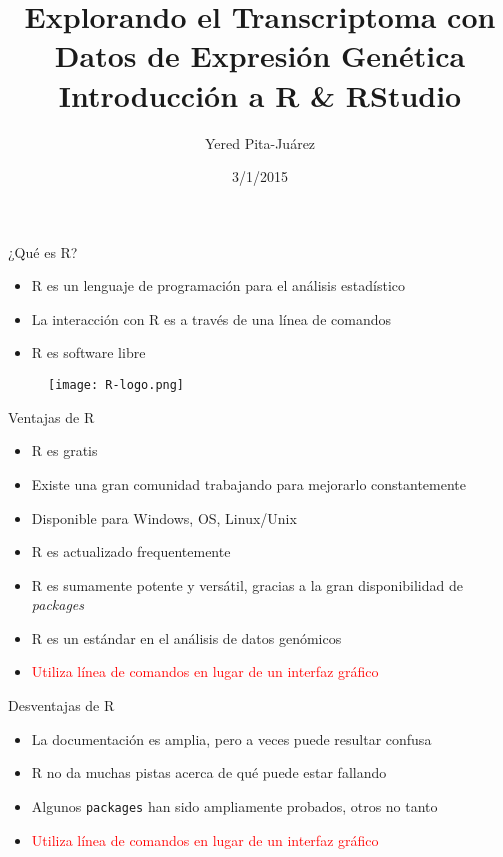 \documentclass{beamer}
\begin{document}
\title[Introducción a R \& RStudio]{Explorando el Transcriptoma con Datos de Expresi\'{o}n Gen\'{e}tica\\
\vspace{0.5cm}
Introducción a R \& RStudio}
\author{Yered Pita-Ju\'{a}rez}
\date{3/1/2015}

\begin{frame}
\titlepage
\end{frame}

\begin{frame}{¿Qué es R?}
\begin{itemize}
\item R es un lenguaje de programación para el análisis estadístico
\item La interacción con R es a través de una línea de comandos
\item R es software libre
\end{itemize}
\begin{figure}[H]
\centering
\texttt{[image: R-logo.png]}
\end{figure}
\end{frame}

\begin{frame}{Ventajas de R}
\begin{itemize}
\item R es gratis
\item Existe una gran comunidad trabajando para mejorarlo constantemente
\item Disponible para Windows, OS, Linux/Unix
\item R es actualizado frequentemente
\item R es sumamente potente y versátil, gracias a la gran disponibilidad de \textit{packages}
\item R es un estándar en el análisis de datos genómicos
\item \textcolor{red}{Utiliza  línea de comandos en lugar de un interfaz gráfico}
\end{itemize}
\begin{center}
{\Huge \smiley}
\end{center}
\end{frame}

\begin{frame}{Desventajas de R}
\begin{itemize}
\item La documentación es amplia, pero a veces puede resultar confusa
\item R no da muchas pistas acerca de qué puede estar fallando
\item Algunos \texttt{packages} han sido ampliamente probados, otros no tanto
\item \textcolor{red}{Utiliza  línea de comandos en lugar de un interfaz gráfico}
\end{itemize}
\begin{center}
{\Huge \frownie}
\end{center}
\end{frame}
\end{document}

